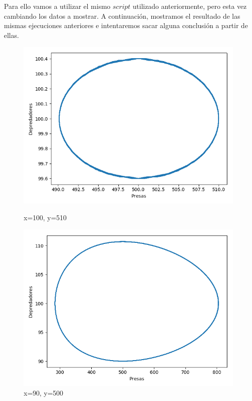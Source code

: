 \documentclass[11pt,a4paper]{article}
\begin{document}
 Para ello vamos a utilizar el mismo $script$ utilizado anteriormente, pero esta vez cambiando los datos a mostrar. A continuación, mostramos
 el resultado de las mismas ejecuciones anteriores e intentaremos sacar alguna conclusión a partir de ellas.
 \begin{figure}[H]
	\centering
	\begin{minipage}{0.5\textwidth}
	  \centering
	  \includegraphics[scale=0.37]{img/3-100-510.png}
	  \caption{x=100,  y=510}
	\end{minipage}%
	\begin{minipage}{0.5\textwidth}
	  \centering
	  \includegraphics[scale=0.37]{img/3-90-500.png}
	  \caption{x=90,  y=500}
	\end{minipage}
\end{figure}
\end{document}
